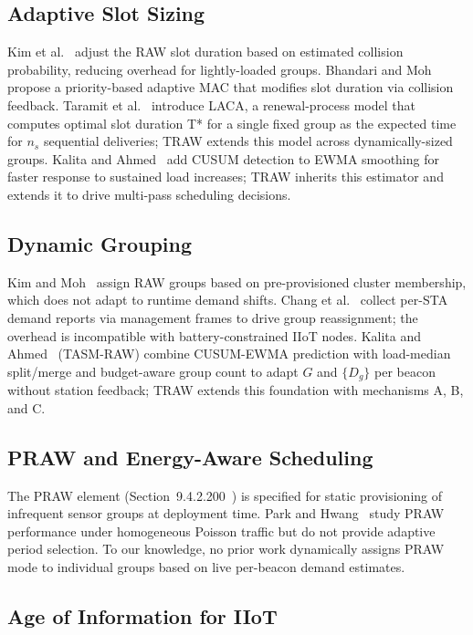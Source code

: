 \documentclass[journal]{IEEEtran}
\begin{document}
\subsection{Adaptive Slot Sizing}

Kim et al.~\cite{kim2017raw} adjust the RAW slot duration based on
estimated collision probability, reducing overhead for lightly-loaded
groups.
Bhandari and Moh~\cite{bhandari2018} propose a priority-based adaptive
MAC that modifies slot duration via collision feedback.
Taramit et al.~\cite{taramit2023} introduce LACA, a renewal-process
model that computes optimal slot duration T* for a single fixed group
as the expected time for $n_s$ sequential deliveries; TRAW extends this
model across dynamically-sized groups.
Kalita and Ahmed~\cite{kalita2025} add CUSUM detection to EWMA smoothing
for faster response to sustained load increases; TRAW inherits this
estimator and extends it to drive multi-pass scheduling decisions.

\subsection{Dynamic Grouping}

Kim and Moh~\cite{kim2017} assign RAW groups based on pre-provisioned
cluster membership, which does not adapt to runtime demand shifts.
Chang et al.~\cite{chang2019} collect per-STA demand reports via
management frames to drive group reassignment; the overhead is
incompatible with battery-constrained IIoT nodes.
Kalita and Ahmed~\cite{kalita2025b} (TASM-RAW) combine CUSUM-EWMA
prediction with load-median split/merge and budget-aware group count
to adapt $G$ and $\{D_g\}$ per beacon without station feedback; TRAW
extends this foundation with mechanisms A, B, and C.

\subsection{PRAW and Energy-Aware Scheduling}

The PRAW element (Section~9.4.2.200~\cite{std80211ah}) is specified for
static provisioning of infrequent sensor groups at deployment time.
Park and Hwang~\cite{park2019praw} study PRAW performance under
homogeneous Poisson traffic but do not provide adaptive period selection.
To our knowledge, no prior work dynamically assigns PRAW mode to
individual groups based on live per-beacon demand estimates.

\subsection{Age of Information for IIoT}
\end{document}

